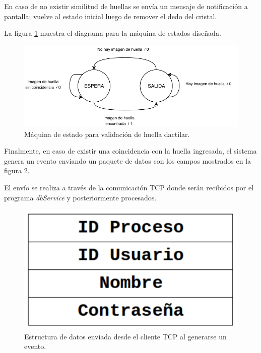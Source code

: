 En caso de no existir similitud de huellas se envía un mensaje de notificación a pantalla; vuelve al estado inicial luego de remover el dedo del cristal.

La figura \ref{fig:maquinabio} muestra el diagrama para la máquina de estados diseñada.

\begin{figure}[H]
	\centering
	\includegraphics[scale=1]{./Figures/maquinabio.pdf}
	\caption{Máquina de estado para validación de huella dactilar.}
	\label{fig:maquinabio}
\end{figure}

Finalmente, en caso de existir una coincidencia con la huella ingresada, el sistema genera un evento enviando un paquete de datos con los campos mostrados en la figura \ref{fig:estructuradata}. 

El envío se realiza a través de la comunicación TCP donde serán recibidos por el programa \textit{dbService} y posteriormente procesados.

\begin{figure}[H]
	\centering
	\includegraphics[scale=.1]{./Figures/estructuradata.png}
	\caption{Estructura de datos enviada desde el cliente TCP al generarse un evento.}
	\label{fig:estructuradata}
\end{figure}


